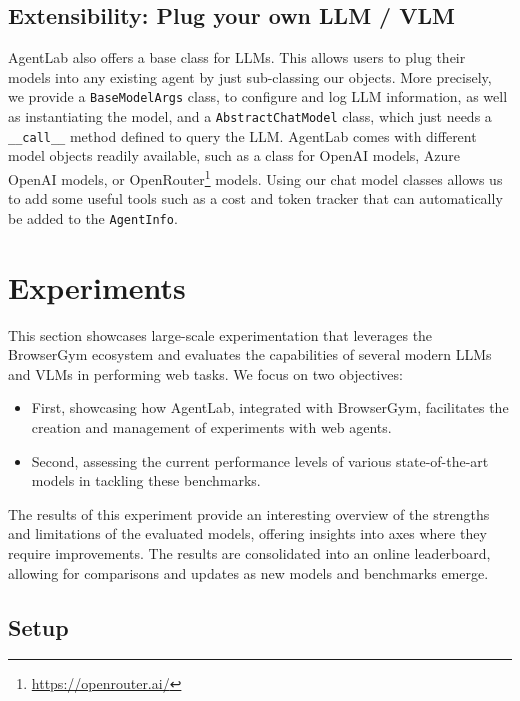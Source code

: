 \documentclass[10pt]{article} %
\newcommand{\code}[1]{\texttt{#1}}
\begin{document}
\subsection{Extensibility: Plug your own LLM / VLM}

AgentLab also offers a base class for LLMs. This allows users to plug their models into any existing agent by just sub-classing our objects. More precisely, we provide a \code{BaseModelArgs} class, to configure and log LLM information, as well as instantiating the model, and a \code{AbstractChatModel} class, which just needs a \code{__call__} method defined to query the LLM.
%
AgentLab comes with different model objects readily available, such as a class for OpenAI models, Azure OpenAI models, or OpenRouter\footnote{\url{https://openrouter.ai/}} models. Using our chat model classes allows us to add some useful tools such as a cost and token tracker that can automatically be added to the \code{AgentInfo}.



\section{Experiments}
\label{sec:experiments}

This section showcases large-scale experimentation that leverages the BrowserGym ecosystem and evaluates the capabilities of several modern LLMs and VLMs in performing web tasks. We focus on two objectives:

\begin{itemize}
    \item First, showcasing how AgentLab, integrated with BrowserGym, facilitates the creation and management of experiments with web agents.
    \item Second, assessing the current performance levels of various state-of-the-art models in tackling these benchmarks.
\end{itemize}

The results of this experiment provide an interesting overview of the strengths and limitations of the evaluated models, offering insights into axes where they require improvements.
%
The results are consolidated into an online leaderboard, allowing for comparisons and updates as new models and benchmarks emerge.
 

\subsection{Setup}
\end{document}
